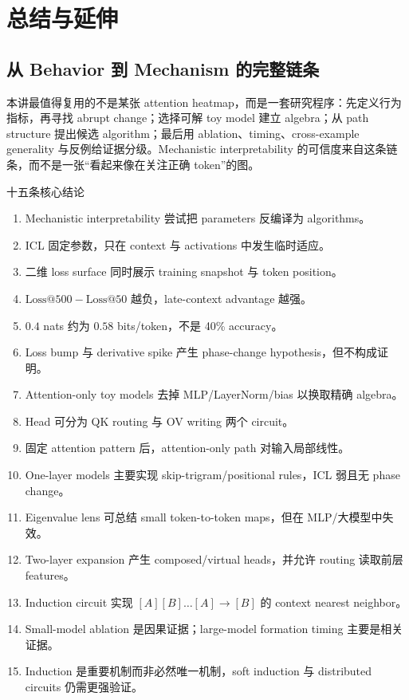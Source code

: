 \section{总结与延伸}

\subsection{从 Behavior 到 Mechanism 的完整链条}

本讲最值得复用的不是某张 attention heatmap，而是一套研究程序：先定义行为指标，再寻找 abrupt change；选择可解 toy model 建立 algebra；从 path structure 提出候选 algorithm；最后用 ablation、timing、cross-example generality 与反例给证据分级。Mechanistic interpretability 的可信度来自这条链条，而不是一张“看起来像在关注正确 token”的图。

\begin{importantbox}{十五条核心结论}
\begin{enumerate}
  \item Mechanistic interpretability 尝试把 parameters 反编译为 algorithms。
  \item ICL 固定参数，只在 context 与 activations 中发生临时适应。
  \item 二维 loss surface 同时展示 training snapshot 与 token position。
  \item $\mathrm{Loss@500}-\mathrm{Loss@50}$ 越负，late-context advantage 越强。
  \item $0.4$ nats 约为 $0.58$ bits/token，不是 40\% accuracy。
  \item Loss bump 与 derivative spike 产生 phase-change hypothesis，但不构成证明。
  \item Attention-only toy models 去掉 MLP/LayerNorm/bias 以换取精确 algebra。
  \item Head 可分为 QK routing 与 OV writing 两个 circuit。
  \item 固定 attention pattern 后，attention-only path 对输入局部线性。
  \item One-layer models 主要实现 skip-trigram/positional rules，ICL 弱且无 phase change。
  \item Eigenvalue lens 可总结 small token-to-token maps，但在 MLP/大模型中失效。
  \item Two-layer expansion 产生 composed/virtual heads，并允许 routing 读取前层 features。
  \item Induction circuit 实现 $[A][B]\ldots[A]\to[B]$ 的 context nearest neighbor。
  \item Small-model ablation 是因果证据；large-model formation timing 主要是相关证据。
  \item Induction 是重要机制而非必然唯一机制，soft induction 与 distributed circuits 仍需更强验证。
\end{enumerate}
\end{importantbox}

